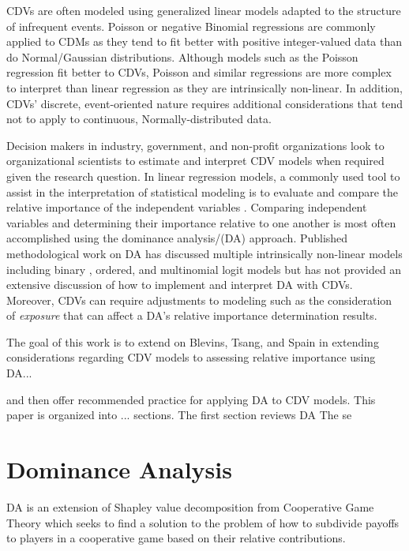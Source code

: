 \documentclass[ShortAfour,times,sageapa]{sagej}
\begin{document}
	
	CDVs are often modeled using generalized linear models adapted to the structure of infrequent events.
	Poisson or negative Binomial regressions \cite{} are commonly applied to CDMs as they tend to fit better with positive integer-valued data than do Normal/Gaussian distributions.  
	Although models such as the Poisson regression fit better to CDVs, Poisson and similar regressions are more complex to interpret than linear regression as they are intrinsically non-linear.
	In addition, CDVs' discrete, event-oriented nature requires additional considerations that tend not to apply to continuous, Normally-distributed data.
	
	
	Decision makers in industry, government, and non-profit organizations look to organizational scientists to estimate and interpret CDV models when required given the research question. 
	In linear regression models, a commonly used tool to assist in the interpretation of statistical modeling is to evaluate and compare the relative importance of the independent variables \cite{}. 
	Comparing independent variables and determining their importance relative to one another is most often accomplished using the dominance analysis/(DA) \cite{} approach. 
	Published methodological work on DA has discussed multiple intrinsically non-linear models including binary \cite{}, ordered, and multinomial logit \cite{} models but has not provided an extensive discussion of how to implement and interpret DA with CDVs.  
	Moreover, CDVs can require adjustments to modeling such as the consideration of \textit{exposure} that can affect a DA's relative importance determination results.
	
	
	The goal of this work is to extend on Blevins, Tsang, and Spain \cite{blevins2015count} in extending considerations regarding CDV models to assessing relative importance using DA...
	
	 and then offer recommended practice for applying DA to CDV models.
	This paper is organized into ... sections.  
	The first section reviews DA
	The se
		
\section{Dominance Analysis}
	
	DA is an extension of Shapley value decomposition from Cooperative Game Theory %
	\cite{} which seeks to find a solution to the problem of how to subdivide payoffs to players in a cooperative game based on their relative contributions.
	
\end{document}
